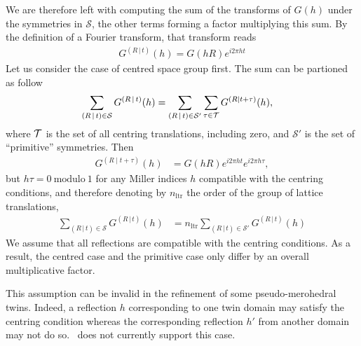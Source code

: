 \documentclass[pdf]{iucr}
\newcommand{\sym}[2]{\left( #1\,\vert\, #2 \right)}
\begin{document}
We are therefore left with computing the sum of the transforms of $G(h)$ under the symmetries in $\mathcal{S}$, the other terms forming a factor multiplying this sum. By the definition of a Fourier transform, that transform reads
\begin{align}
G^{\sym{R}{t}}(h) = G(hR)e^{i 2\pi ht}
\label{eqn:transformofG}
\end{align}
Let us consider the case of centred space group first. The sum can be partioned as follow
\begin{align}
 \sum_{\sym{R}{t} \in \mathcal{S}} G^{\sym{R}{t}}(h) &=  \sum_{\sym{R}{t} \in \mathcal{S}'} \sum_{\tau \in \cal{T}} G^{(R \mid t+\tau)}(h), \nonumber
\end{align}
where $\cal{T}$ is the set of all centring translations, including zero, and $\mathcal{S}'$ is the set of ``primitive'' symmetries. Then
\begin{align}
G^{(R \mid t + \tau)}(h) &= G(hR) e^{i2\pi ht} e^{i2\pi h\tau}, \nonumber
\end{align}
but $h\tau=0\ \text{modulo}\ 1$ for any Miller indices $h$ compatible with the centring conditions, and therefore denoting by $n_{\text{ltr}}$ the order of the group of lattice translations,
\begin{align}
\sum_{\sym{R}{t} \in \mathcal{S}} G^{\sym{R}{t}}(h) &= n_{\text{ltr}} \sum_{\sym{R}{t} \in \mathcal{S}'} G^{\sym{R}{t}}(h)
\end{align}
We assume that all reflections are compatible with the centring conditions. As a result,
the centred case and the primitive case only differ by an overall multiplicative factor.

This assumption can be invalid in the refinement of some pseudo-merohedral twins. Indeed, a reflection $h$ corresponding to one twin domain may satisfy the centring condition whereas the corresponding reflection $h'$ from another domain may not do so. \olexrefine\ does not currently support this case.   
\end{document}
